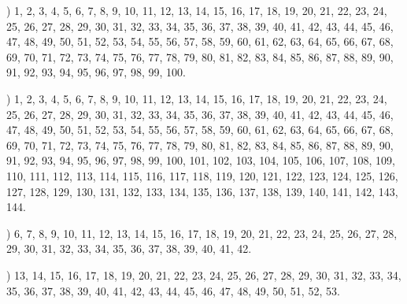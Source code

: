 \documentclass[a4paper,11pt]{article}
\begin{document}
\vspace{\spaceFour}



\noindent
{}) 1, 2, 3, 4, 5, 6, 7, 8, 9, 10, 11, 12, 13, 14, 15,
16, 17, 18, 19, 20, 21, 22, 23, 24, 25, 26, 27, 28, 29, 30, 31, 32,
33, 34, 35, 36, 37, 38, 39, 40, 41, 42, 43, 44, 45, 46, 47, 48, 49,
50, 51, 52, 53, 54, 55, 56, 57, 58, 59, 60, 61, 62, 63, 64, 65, 66,
67, 68, 69, 70, 71, 72, 73, 74, 75, 76, 77, 78, 79, 80, 81, 82, 83,
84, 85, 86, 87, 88, 89, 90, 91, 92, 93, 94, 95, 96, 97, 98, 99, 100.

\vspace{\spaceFour}



\noindent
{}) 1, 2, 3, 4, 5, 6, 7, 8, 9, 10, 11, 12, 13, 14, 15,
16, 17, 18, 19, 20, 21, 22, 23, 24, 25, 26, 27, 28, 29, 30, 31, 32,
33, 34, 35, 36, 37, 38, 39, 40, 41, 42, 43, 44, 45, 46, 47, 48, 49,
50, 51, 52, 53, 54, 55, 56, 57, 58, 59, 60, 61, 62, 63, 64, 65, 66,
67, 68, 69, 70, 71, 72, 73, 74, 75, 76, 77, 78, 79, 80, 81, 82, 83,
84, 85, 86, 87, 88, 89, 90, 91, 92, 93, 94, 95, 96, 97, 98, 99, 100,
101, 102, 103, 104, 105, 106, 107, 108, 109, 110, 111, 112, 113, 114,
115, 116, 117, 118, 119, 120, 121, 122, 123, 124, 125, 126, 127, 128,
129, 130, 131, 132, 133, 134, 135, 136, 137, 138, 139, 140, 141, 142,
143, 144.


\vspace{\spaceTwo}












\noindent
{}) 6, 7, 8, 9, 10, 11, 12, 13, 14, 15, 16, 17, 18, 19,
20, 21, 22, 23, 24, 25, 26, 27, 28, 29, 30, 31, 32, 33, 34, 35, 36,
37, 38, 39, 40, 41, 42.

\vspace{\spaceFour}



\noindent
{}) 13, 14, 15, 16, 17, 18, 19, 20, 21, 22, 23, 24, 25,
26, 27, 28, 29, 30, 31, 32, 33, 34, 35, 36, 37, 38, 39, 40, 41, 42,
43, 44, 45, 46, 47, 48, 49, 50, 51, 52, 53.
\end{document}
